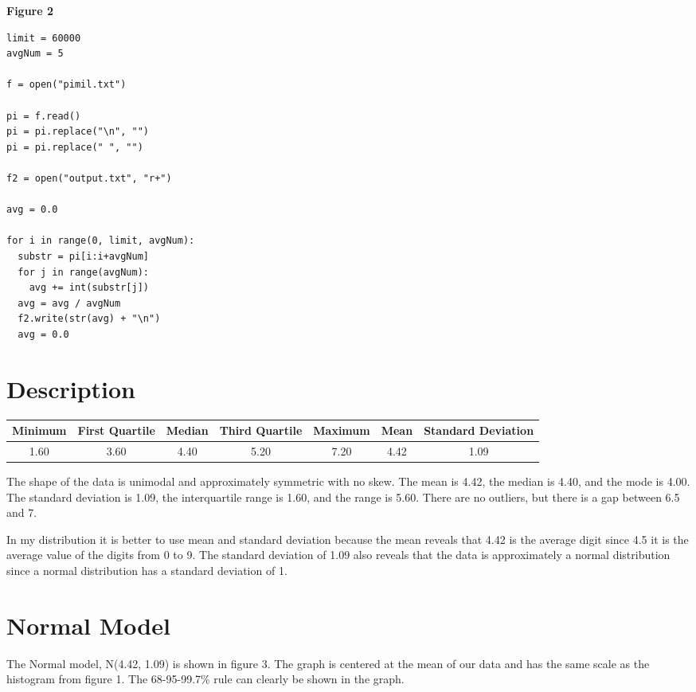 \documentclass{article}
\begin{document}
\vspace{20px}
 
\centerline{\textbf{Figure 2}}
 
\begin{lstlisting}
limit = 60000
avgNum = 5
 
f = open("pimil.txt")
 
pi = f.read()
pi = pi.replace("\n", "")
pi = pi.replace(" ", "")
 
f2 = open("output.txt", "r+")
 
avg = 0.0
 
for i in range(0, limit, avgNum):
  substr = pi[i:i+avgNum]
  for j in range(avgNum):
    avg += int(substr[j])
  avg = avg / avgNum
  f2.write(str(avg) + "\n")
  avg = 0.0
\end{lstlisting}
 
\section{Description}
\begin{center}
  \begin{tabular}{||c | c | c | c | c | c | c||}
  \hline\hline
  Minimum & First Quartile & Median & Third Quartile & Maximum & Mean & Standard Deviation\\ [0.5ex]
  \hline
  1.60 & 3.60 & 4.40 & 5.20 & 7.20 & 4.42 & 1.09\\
  \hline\hline
  \end{tabular}
\end{center}
{The shape of the data is unimodal and approximately symmetric with no skew. The mean is 4.42, the median is 4.40, and the mode is 4.00. The standard deviation is 1.09, the interquartile range is 1.60, and the range is 5.60. There are no outliers, but there is a gap between 6.5 and 7.}
 
{In my distribution it is better to use mean and standard deviation because the mean reveals that 4.42 is the average digit since 4.5 it is the average value of the digits from 0 to 9. The standard deviation of 1.09 also reveals that the data is approximately a normal distribution since a normal distribution has a standard deviation of 1.}
 
\section{Normal Model}
 
{The Normal model, N(4.42, 1.09) is shown in figure 3. The graph is centered at the mean of our data and has the same scale as the histogram from figure 1. The 68-95-99.7\% rule can clearly be shown in the graph.}
 
\end{document}
